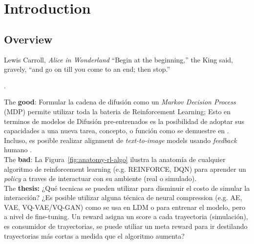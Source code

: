 \chapter{Introduction}

\section{Overview}

\begin{chapquote}{Lewis Carroll, \textit{Alice in Wonderland}}
``Begin at the beginning,'' the King said, gravely, ``and go on till you come to an end; then stop.''
\end{chapquote}


.

The \textbf{good}: Formular la cadena de difusión como un \textit{Markov Decision Process} (MDP) permite utilizar toda la bateria de Reinforcement Learning; Esto en terminos de modelos de Difusión pre-entrenados es la posibilidad de adoptar sus capacidades a una nueva tarea, concepto, o función como se demuestre en \cite{black2023training}. Incluso, es posible realizar alignment de \textit{text-to-image} models usando \textit{feedback} humano \cite{ouyang2022training}. \\

The \textbf{bad}: La Figura~\ref{fig:anatomy-rl-algo} ilustra la anatomía de cualquier algoritmo de reinforcement learning (e.g. REINFORCE, DQN) para aprender un \textit{policy} a traves de interactuar con su ambiente (real o simulado). \\

The \textbf{thesis:} ¿Qué tecnicas se pueden utilizar para disminuir el costo de simular la interacción? ¿Es posible utilizar alguna técnica de neural compression (e.g. AE, VAE, VQ-VAE/VQ-GAN) como se usa en LDM \cite{rombach2022highresolution} o \cite{pernias2023wuerstchen} para entrenar el modelo, pero a nivel de fine-tuning. Un reward asigna un score a cada trayectoria (simulación), es consumidor de trayectorias, se puede utiliar un meta reward para ir destilando trayectorias más cortas a medida que el algoritmo aumenta? \\


